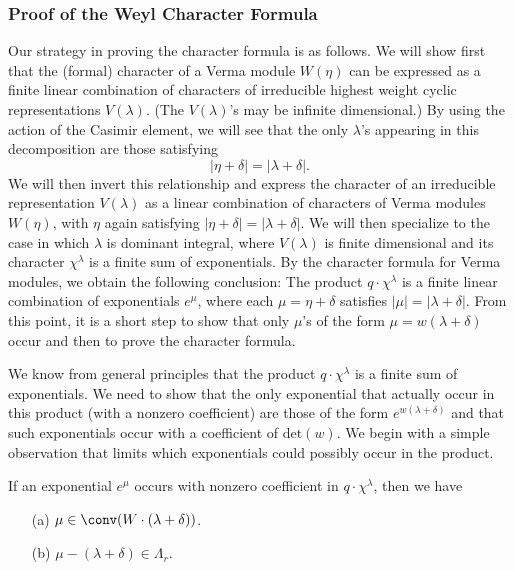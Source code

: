 \subsubsection{Proof of the Weyl Character Formula}
Our strategy in proving the character formula is as follows. We will show first that the (formal) character of a Verma module $W(\eta)$ can be expressed as a finite linear combination of characters of irreducible highest weight cyclic representations $V(\lambda)$. (The $V(\lambda)$'s may be infinite dimensional.) By using the action of the Casimir element, we will see that the only $\lambda$'s appearing in this decomposition are those satisfying
\[|\eta+\delta|=|\lambda+\delta|.\]
We will then invert this relationship and express the character of an irreducible representation $V(\lambda)$ as a linear combination of characters of Verma modules $W(\eta)$, with $\eta$ again satisfying $|\eta+\delta|=|\lambda+\delta|$. We will then specialize to the case in which $\lambda$ is dominant integral, where $V(\lambda)$ is finite dimensional and its character $\chi^\lambda$ is a finite sum of exponentials. By the character formula for Verma modules, we obtain the following conclusion: The product $q\cdot \chi^\lambda$ is a finite linear combination of exponentials $e^{\mu}$, where each $\mu=\eta+\delta$ satisfies $|\mu|=|\lambda+\delta|$. From this point, it is a short step to show that only $\mu$'s of the form $\mu=w(\lambda+\delta)$ occur and then to prove the character formula.\par
We know from general principles that the product $q\cdot\chi^\lambda$ is a finite sum of exponentials. We need to show that the only exponential that actually occur in this product (with a nonzero coefficient) are those of the form $e^{w(\lambda+\delta)}$ and that such exponentials occur with a coefficient of $\mathrm{det}(w)$. We begin with a simple observation that limits which exponentials could possibly occur in the product.
\begin{proposition}\label{Lie algebra exponential in character first condition}
If an exponential $e^{\mu}$ occurs with nonzero coefficient in $q\cdot\chi^\lambda$, then we have
\begin{itemize}
\item[(a)] $\mu\in\conv(W\cdot(\lambda+\delta))$.
\item[(b)] $\mu-(\lambda+\delta)\in\Lambda_r$.
\end{itemize}
\end{proposition}
